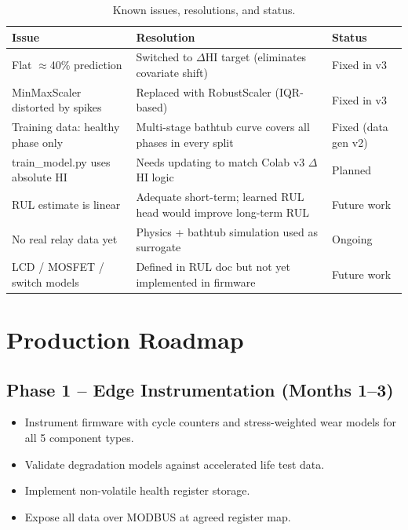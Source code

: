\documentclass[12pt,a4paper]{article}
\begin{document}
\begin{table}[H]
\centering
\begin{tabularx}{\textwidth}{lXl}
\toprule
\textbf{Issue} & \textbf{Resolution} & \textbf{Status} \\
\midrule
Flat $\approx$40\% prediction     & Switched to $\Delta$HI target (eliminates covariate shift)         & Fixed in v3 \\
MinMaxScaler distorted by spikes  & Replaced with RobustScaler (IQR-based)                            & Fixed in v3 \\
Training data: healthy phase only & Multi-stage bathtub curve covers all phases in every split         & Fixed (data gen v2) \\
train\_model.py uses absolute HI  & Needs updating to match Colab v3 $\Delta$HI logic                 & Planned \\
RUL estimate is linear            & Adequate short-term; learned RUL head would improve long-term RUL & Future work \\
No real relay data yet            & Physics + bathtub simulation used as surrogate                     & Ongoing \\
LCD / MOSFET / switch models      & Defined in RUL doc but not yet implemented in firmware             & Future work \\
\bottomrule
\end{tabularx}
\caption{Known issues, resolutions, and status.}
\end{table}

\section{Production Roadmap}

\subsection{Phase 1 -- Edge Instrumentation (Months 1--3)}
\begin{itemize}[noitemsep]
  \item Instrument firmware with cycle counters and stress-weighted wear models for all 5 component types.
  \item Validate degradation models against accelerated life test data.
  \item Implement non-volatile health register storage.
  \item Expose all data over MODBUS at agreed register map.
\end{itemize}
\end{document}
